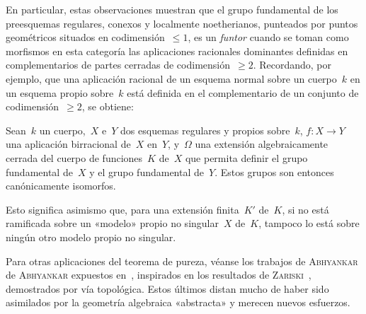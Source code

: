 En particular, estas observaciones muestran que el grupo fundamental de los
preesquemas regulares, conexos y localmente noetherianos, punteados por puntos
geométricos situados en codimensión~$\le 1$, es un \emph{funtor} cuando se
toman como morfismos en esta categoría las aplicaciones racionales dominantes
definidas en complementarios de partes cerradas de codimensión~$\ge 2$.
Recordando, por ejemplo, que una aplicación racional de un esquema normal sobre
un cuerpo~$k$ en un esquema propio sobre~$k$ está definida en el complementario
de un conjunto de codimensión~$\ge 2$, se obtiene:

\begin{corollaire}
\label{X.3.4}
%
%
Sean~$k$ un cuerpo,~$X$ e~$Y$ dos esquemas regulares y propios sobre~$k$,
$f\colon X\to Y$ una aplicación birracional de~$X$ en~$Y$, y~$\Omega$ una
extensión algebraicamente cerrada del cuerpo de funciones~$K$ de~$X$ que
permita definir el grupo fundamental de~$X$ y el grupo fundamental de~$Y$.
Estos grupos son entonces canónicamente isomorfos.
\end{corollaire}

Esto significa asimismo que, para una extensión finita~$K'$ de~$K$, si no está
ramificada sobre un «modelo» propio no singular~$X$ de~$K$, tampoco lo está
sobre ningún otro modelo propio no singular.

\begin{remarque}
\label{X.3.5}
Para otras aplicaciones del teorema de pureza, véanse los trabajos
{de \textsc{Abhyankar}}
{de \textsc{Abhyankar}}
expuestos en~\cite{X.4}, inspirados en los resultados de
\textsc{Zariski}~\cite[cap\ptbl VIII]{X.6}, demostrados por vía topológica.
Estos últimos distan mucho de haber sido asimilados por la geometría algebraica
«abstracta» y merecen nuevos esfuerzos.
\end{remarque}

